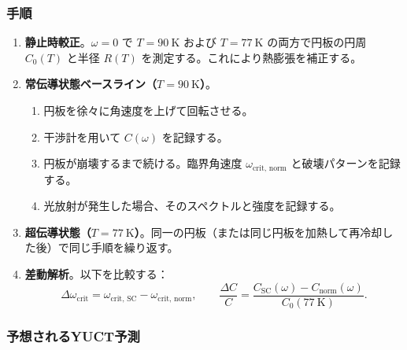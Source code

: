 \documentclass[12pt,a4paper]{article}
\begin{document}
	\subsubsection{手順}
	
	\begin{enumerate}
		\item \textbf{静止時較正}。\(\omega = 0\) で \(T = 90\ \text{K}\) および \(T = 77\ \text{K}\) の両方で円板の円周 \(C_0(T)\) と半径 \(R(T)\) を測定する。これにより熱膨張を補正する。
		
		\item \textbf{常伝導状態ベースライン（\(T = 90\ \text{K}\)）}。 
		\begin{enumerate}
			\item 円板を徐々に角速度を上げて回転させる。
			\item 干渉計を用いて \(C(\omega)\) を記録する。
			\item 円板が崩壊するまで続ける。臨界角速度 \(\omega_{\text{crit, norm}}\) と破壊パターンを記録する。
			\item 光放射が発生した場合、そのスペクトルと強度を記録する。
		\end{enumerate}
		
		\item \textbf{超伝導状態（\(T = 77\ \text{K}\)）}。同一の円板（または同じ円板を加熱して再冷却した後）で同じ手順を繰り返す。
		
		\item \textbf{差動解析}。以下を比較する：
		\[
		\Delta \omega_{\text{crit}} = \omega_{\text{crit, SC}} - \omega_{\text{crit, norm}},\qquad
		\frac{\Delta C}{C} = \frac{C_{\text{SC}}(\omega) - C_{\text{norm}}(\omega)}{C_0(77\ \text{K})}.
		\]
	\end{enumerate}
	
	\subsubsection{予想されるYUCT予測}
	
\end{document}
